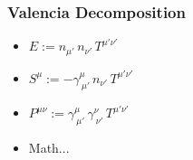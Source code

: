 \documentclass{beamer}
\begin{document}
\begin{frame}
\frametitle{Valencia Decomposition}

  \begin{itemize}[<+->]
    \item[]
      $E:=n_{\mu'}\,n_{\nu'}\,T^{\mu'\nu'}$\vspace{1em}
    \item[]
      $S^{\mu}:=-\gamma^{\mu}_{~\mu'}\,n_{\nu'}\,T^{\mu'\nu'}$\vspace{1em}
    \item[]
      $P^{\mu\nu}:=\gamma^{\mu}_{~\mu'}\,\gamma^{\nu}_{~\nu'}\,
      T^{\mu'\nu'}$\vspace{1em}
    \item[]
      Math...
  \end{itemize}

\end{frame}
\end{document}
